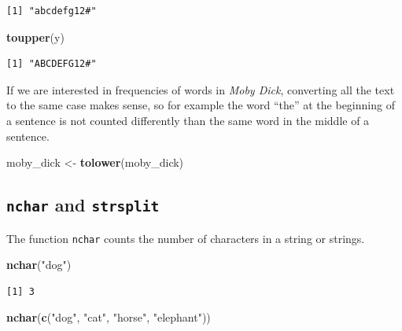 \documentclass[
]{krantz}
\makeatletter
\newenvironment{Shaded}{\begin{snugshade}}{\end{snugshade}}
\newcommand{\KeywordTok}[1]{\textcolor[rgb]{0.27,0.27,0.27}{\textbf{#1}}}
\newcommand{\NormalTok}[1]{#1}
\newcommand{\StringTok}[1]{\textcolor[rgb]{0.5,0.5,0.5}{#1}}
\newenvironment{kframe}{%
\medskip{}
\setlength{\fboxsep}{.8em}
 \def\at@end@of@kframe{}%
 \ifinner\ifhmode%
  \def\at@end@of@kframe{\end{minipage}}%
  \begin{minipage}{\columnwidth}%
 \fi\fi%
 \def\FrameCommand##1{\hskip\@totalleftmargin \hskip-\fboxsep
 \colorbox{shadecolor}{##1}\hskip-\fboxsep
     \hskip-\linewidth \hskip-\@totalleftmargin \hskip\columnwidth}%
 \MakeFramed {\advance\hsize-\width
   \@totalleftmargin\z@ \linewidth\hsize
   \@setminipage}}%
 {\par\unskip\endMakeFramed%
 \at@end@of@kframe}
\renewenvironment{Shaded}{\begin{kframe}}{\end{kframe}}
\makeatother
\begin{document}
\begin{verbatim}
[1] "abcdefg12#"
\end{verbatim}

\begin{Shaded}
\begin{Highlighting}[]
\KeywordTok{toupper}\NormalTok{(y)}
\end{Highlighting}
\end{Shaded}

\begin{verbatim}
[1] "ABCDEFG12#"
\end{verbatim}

If we are interested in frequencies of words in \emph{Moby Dick}, converting all the text to the same case makes sense, so for example the word ``the'' at the beginning of a sentence is not counted differently than the same word in the middle of a sentence.

\begin{Shaded}
\begin{Highlighting}[]
\NormalTok{moby\_dick \textless{}{-}}\StringTok{ }\KeywordTok{tolower}\NormalTok{(moby\_dick)}
\end{Highlighting}
\end{Shaded}

\hypertarget{nchar-and-strsplit}{%
\subsection{\texorpdfstring{\texttt{nchar} and \texttt{strsplit}}{nchar and strsplit}}\label{nchar-and-strsplit}}

The function \texttt{nchar} counts the number of characters in a string or strings.

\begin{Shaded}
\begin{Highlighting}[]
\KeywordTok{nchar}\NormalTok{(}\StringTok{"dog"}\NormalTok{)}
\end{Highlighting}
\end{Shaded}

\begin{verbatim}
[1] 3
\end{verbatim}

\begin{Shaded}
\begin{Highlighting}[]
\KeywordTok{nchar}\NormalTok{(}\KeywordTok{c}\NormalTok{(}\StringTok{"dog"}\NormalTok{, }\StringTok{"cat"}\NormalTok{, }\StringTok{"horse"}\NormalTok{, }\StringTok{"elephant"}\NormalTok{))}
\end{Highlighting}
\end{Shaded}
\end{document}
